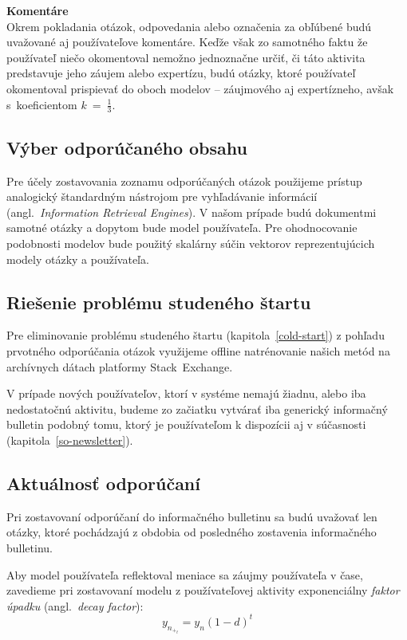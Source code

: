 \textbf{Komentáre}\\
Okrem pokladania otázok, odpovedania alebo označenia za obľúbené budú uvažované aj používateľove komentáre. Keďže však
zo samotného faktu že používateľ niečo okomentoval nemožno jednoznačne určiť, či táto aktivita predstavuje jeho záujem
alebo expertízu, budú otázky, ktoré používateľ okomentoval prispievať do oboch modelov -- záujmového aj expertízneho, avšak
s~koeficientom $k~=~\frac{1}{3}$.

\subsection{Výber odporúčaného obsahu}\label{design:rec-retrieval}

Pre účely zostavovania zoznamu odporúčaných otázok použijeme prístup analogický štandardným nástrojom pre vyhľadávanie
informácií (angl.~\emph{Information Retrieval Engines}). V našom prípade budú dokumentmi samotné otázky a dopytom bude
model používateľa. Pre ohodnocovanie podobnosti modelov bude použitý skalárny súčin vektorov reprezentujúcich
modely otázky a používateľa.


\subsection{Riešenie problému studeného štartu}

Pre eliminovanie problému studeného štartu (kapitola~\ref{cold-start}) z pohľadu prvotného odporúčania otázok využijeme
offline natrénovanie našich metód na archívnych dátach platformy Stack~Exchange.

V prípade nových používateľov, ktorí v systéme nemajú žiadnu, alebo iba nedostatočnú aktivitu, budeme zo začiatku vytvárať
iba generický informačný bulletin podobný tomu, ktorý je používateľom k dispozícii aj v súčasnosti (kapitola~\ref{so-newsletter}).


\subsection{Aktuálnosť odporúčaní}

Pri zostavovaní odporúčaní do informačného bulletinu sa budú uvažovať len otázky, ktoré pochádzajú
z obdobia od posledného zostavenia informačného bulletinu.

Aby model používateľa reflektoval meniace sa záujmy používateľa v čase, zavedieme pri zostavovaní modelu z používateľovej
aktivity exponenciálny \textit{faktor úpadku} (angl.~\textit{decay factor}):
$$y_n_+_t = y_n (1 - d)^t$$


